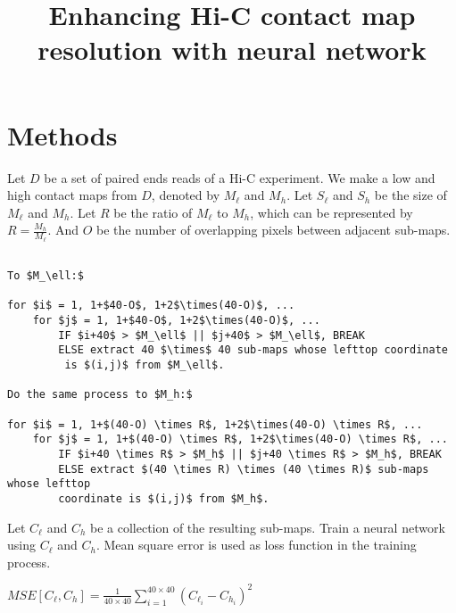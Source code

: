 \documentclass{article}
\begin{document}
\title{Enhancing Hi-C contact map resolution with neural network}
\author{}
\maketitle



\section{Methods}


Let $D$ be a set of paired ends reads of a Hi-C experiment. 
We make a low and high contact maps from $D$, denoted by $M_\ell$ and $M_h$. 
Let $S_\ell$ and $S_h$ be the size of $M_\ell$ and $M_h$. 
Let $R$ be the ratio of $M_\ell$ to $M_h$, which can be represented by
$R = \frac{M_h}{M_\ell}$. And $O$ be the number of overlapping pixels between adjacent sub-maps.

\begin{Verbatim}[commandchars=\\\{\},codes={\catcode`$=3\catcode`_=8\catcode`^=7}]
% Divide matrices $M_\ell$ and $M_h$ \

To $M_\ell:$

for $i$ = 1, 1+$40-O$, 1+2$\times(40-O)$, ...
    for $j$ = 1, 1+$40-O$, 1+2$\times(40-O)$, ...
        IF $i+40$ > $M_\ell$ || $j+40$ > $M_\ell$, BREAK 
        ELSE extract 40 $\times$ 40 sub-maps whose lefttop coordinate
         is $(i,j)$ from $M_\ell$.

Do the same process to $M_h:$

for $i$ = 1, 1+$(40-O) \times R$, 1+2$\times(40-O) \times R$, ...
    for $j$ = 1, 1+$(40-O) \times R$, 1+2$\times(40-O) \times R$, ...
        IF $i+40 \times R$ > $M_h$ || $j+40 \times R$ > $M_h$, BREAK 
        ELSE extract $(40 \times R) \times (40 \times R)$ sub-maps whose lefttop 
        coordinate is $(i,j)$ from $M_h$.
\end{Verbatim}



Let $C_\ell$ and $C_h$ be a collection of the resulting sub-maps. 
Train a neural network using $C_\ell$ and $C_h$. Mean square error is used as 
loss function in the training process. 

\begin{center}
    $MSE[C_\ell, C_h] = \frac{1}{40 \times 40} \sum_{i=1}^{40 \times 40} (C_{\ell_i}-C_{h_i})^2$
\end{center}
\end{document}
